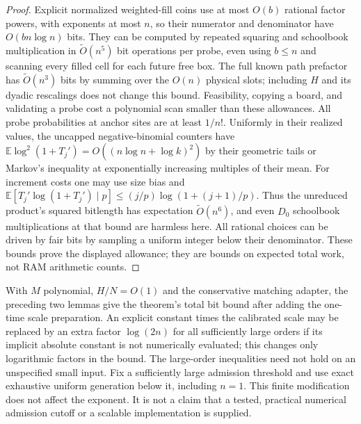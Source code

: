 \begin{proof}
Explicit normalized weighted-fill coins use at most $O(b)$ rational
factor powers, with exponents at most $n$, so their numerator and
denominator have $O(bn\log n)$ bits. They can be computed by repeated
squaring and schoolbook multiplication in $\widetilde O(n^5)$ bit
operations per probe, even using $b\le n$ and scanning every filled
cell for each future free box. The full known path prefactor has
$\widetilde O(n^3)$ bits by summing over the $O(n)$ physical slots;
including $H$ and its dyadic rescalings does not change this bound.
Feasibility, copying a board, and validating a probe cost a polynomial
scan smaller than these allowances. All probe probabilities at
anchor sites are at least $1/n!$. Uniformly in their realized
values, the uncapped negative-binomial counters have
$\mathbb E\log^2(1+T_j')=O((n\log n+\log k)^2)$ by their geometric
tails or Markov's inequality at exponentially increasing multiples
of their mean. For increment costs one may use size bias and
$\mathbb E[T_j'\log(1+T_j')\mid p]\le
(j/p)\log(1+(j+1)/p)$. Thus the unreduced product's squared bitlength
has expectation $\widetilde O(n^6)$, and even $D_0$ schoolbook
multiplications at that bound are harmless here. All rational
choices can be driven by fair bits by sampling a uniform integer
below their denominator. These bounds prove the displayed allowance;
they are bounds on expected total work, not RAM arithmetic counts.
\end{proof}

With $M$ polynomial, $H/N=O(1)$ and the conservative matching
adapter, the preceding two lemmas give the theorem's total bit
bound after adding the one-time scale preparation. An explicit
constant times the calibrated scale may be replaced by an extra
factor $\log(2n)$ for all sufficiently large orders if its implicit
absolute constant is not numerically evaluated; this changes only
logarithmic factors in the bound. The large-order inequalities need
not hold on an unspecified small input. Fix a sufficiently large
admission threshold and use exact exhaustive uniform generation
below it, including $n=1$. This finite modification does not affect
the exponent. It is not a claim that a tested, practical numerical
admission cutoff or a scalable implementation is supplied.
